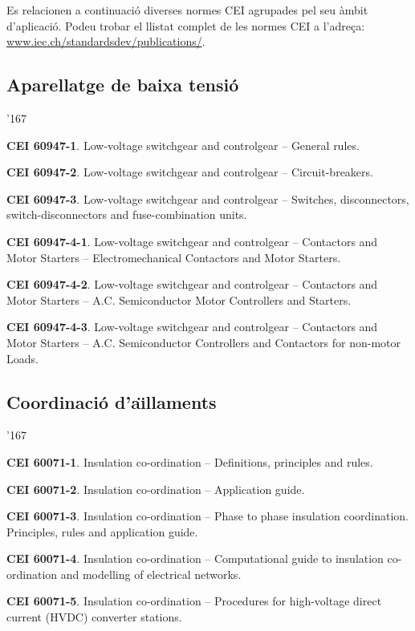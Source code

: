 Es relacionen a continuaci\'{o} diverses normes \textsf{CEI} agrupades pel seu \`{a}mbit d'aplicaci\'{o}. Podeu trobar el llistat complet de les normes \textsf{CEI} a l'adre\c{c}a: \href{http://www.iec.ch/standardsdev/publications/}{www.iec.ch/standardsdev/publications/}.

\subsection*{Aparellatge de baixa tensi\'{o}}
\begin{dinglist}{'167}
    \item \textbf{CEI 60947-1}. Low-voltage switchgear and controlgear -- General rules.
    \item \textbf{CEI 60947-2}. Low-voltage switchgear and controlgear -- Circuit-breakers.
    \item \textbf{CEI 60947-3}. Low-voltage switchgear and controlgear -- Switches, disconnectors, switch-dis\-con\-nec\-tors and fuse-combination units.
    \item \textbf{CEI 60947-4-1}. Low-voltage switchgear and controlgear -- Contactors and Motor Starters -- Electromechanical Contactors and Motor Starters.
    \item \textbf{CEI 60947-4-2}. Low-voltage switchgear and controlgear -- Contactors and Motor Starters -- A.C. Semiconductor Motor Controllers and Starters.
    \item \textbf{CEI 60947-4-3}. Low-voltage switchgear and controlgear -- Contactors and Motor Starters -- A.C. Semiconductor Controllers and Contactors for non-motor Loads.
\end{dinglist}

\subsection*{Coordinaci\'{o} d'a\"{\i}llaments}
\begin{dinglist}{'167}
    \item \textbf{CEI 60071-1}. Insulation co-ordination -- Definitions, principles and rules.
    \item \textbf{CEI 60071-2}. Insulation co-ordination -- Application guide.
    \item \textbf{CEI 60071-3}. Insulation co-ordination -- Phase to phase insulation coordination. Principles, rules and application guide.
    \item \textbf{CEI 60071-4}. Insulation co-ordination -- Computational guide to insulation co-ordination and modelling of electrical networks.
    \item \textbf{CEI 60071-5}. Insulation co-ordination -- Procedures for high-voltage direct current (HVDC) converter stations.
\end{dinglist}

